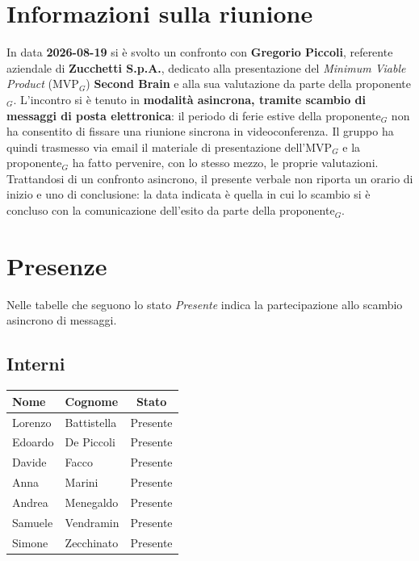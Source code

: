 \documentclass[a4paper, 10pt, colorlinks=true, linkcolor=black, urlcolor=blue, citecolor=blue, hidelinks]{article}
\newcommand{\dataverbale}{2026-08-19}
\def\templatedir{../../../../templates}
\begin{document}
\begin{titlepage}
    
\end{titlepage}

\newpage

\pagestyle{fancy}

\tableofcontents

\newpage
{}

\section{Informazioni sulla riunione}

In data \textbf{\dataverbale} si è svolto un confronto con \textbf{Gregorio Piccoli}, referente aziendale di \textbf{Zucchetti S.p.A.}, dedicato alla presentazione del \textit{Minimum Viable Product} (MVP$_G$) \textbf{Second Brain} e alla sua valutazione da parte della proponente$_G$.
L'incontro si è tenuto in \textbf{modalità asincrona, tramite scambio di messaggi di posta elettronica}: il periodo di ferie estive della proponente$_G$ non ha consentito di fissare una riunione sincrona in videoconferenza. Il gruppo ha quindi trasmesso via email il materiale di presentazione dell'MVP$_G$ e la proponente$_G$ ha fatto pervenire, con lo stesso mezzo, le proprie valutazioni.
Trattandosi di un confronto asincrono, il presente verbale non riporta un orario di inizio e uno di conclusione: la data indicata è quella in cui lo scambio si è concluso con la comunicazione dell'esito da parte della proponente$_G$.

\section{Presenze}

Nelle tabelle che seguono lo stato \textit{Presente} indica la partecipazione allo scambio asincrono di messaggi.

\subsection{Interni}
\begin{center}
\begin{tabular}{|l|l|c|}
\hline
\textbf{Nome} & \textbf{Cognome} & \textbf{Stato} \\
\hline
Lorenzo & Battistella & Presente \\
Edoardo & De Piccoli & Presente \\
Davide & Facco & Presente \\
Anna & Marini & Presente \\
Andrea & Menegaldo & Presente \\
Samuele & Vendramin & Presente \\
Simone & Zecchinato & Presente \\
\hline
\end{tabular}
\end{center}
\end{document}
